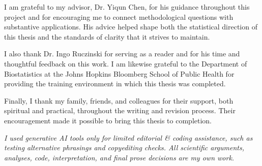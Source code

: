 
I am grateful to my advisor, Dr. Yiqun Chen, for his guidance throughout this project and for encouraging me to connect methodological questions with substantive applications. His advice helped shape both the statistical direction of this thesis and the standards of clarity that it strives to maintain.

I also thank Dr. Ingo Ruczinski for serving as a reader and for his time and thoughtful feedback on this work. I am likewise grateful to the Department of Biostatistics at the Johns Hopkins Bloomberg School of Public Health for providing the training environment in which this thesis was completed.

Finally, I thank my family, friends, and colleagues for their support, both spiritual and practical, throughout the writing and revision process. Their encouragement made it possible to bring this thesis to completion.

\vspace{1.5em}

\emph{I used generative AI tools only for limited editorial \& coding assistance, such as testing alternative phrasings and copyediting checks. All scientific arguments, analyses, code, interpretation, and final prose decisions are my own work.}
